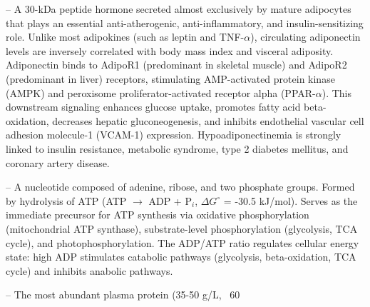 -- A 30-kDa peptide hormone secreted almost exclusively by mature adipocytes that plays an essential anti-atherogenic, anti-inflammatory, and insulin-sensitizing role. Unlike most adipokines (such as leptin and TNF-$\alpha$), circulating adiponectin levels are inversely correlated with body mass index and visceral adiposity. Adiponectin binds to AdipoR1 (predominant in skeletal muscle) and AdipoR2 (predominant in liver) receptors, stimulating AMP-activated protein kinase (AMPK) and peroxisome proliferator-activated receptor alpha (PPAR-$\alpha$). This downstream signaling enhances glucose uptake, promotes fatty acid beta-oxidation, decreases hepatic gluconeogenesis, and inhibits endothelial vascular cell adhesion molecule-1 (VCAM-1) expression. Hypoadiponectinemia is strongly linked to insulin resistance, metabolic syndrome, type 2 diabetes mellitus, and coronary artery disease.

-- A nucleotide composed of adenine, ribose, and two phosphate groups. Formed by hydrolysis of ATP (ATP $\to$ ADP + P$_i$, $\Delta G^\circ$ = -30.5 kJ/mol). Serves as the immediate precursor for ATP synthesis via oxidative phosphorylation (mitochondrial ATP synthase), substrate-level phosphorylation (glycolysis, TCA cycle), and photophosphorylation. The ADP/ATP ratio regulates cellular energy state: high ADP stimulates catabolic pathways (glycolysis, beta-oxidation, TCA cycle) and inhibits anabolic pathways.

-- The most abundant plasma protein (35-50 g/L, ~60%

